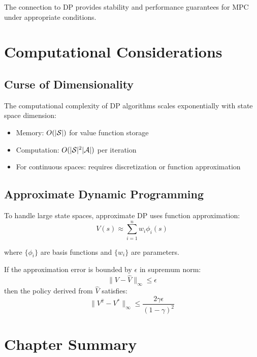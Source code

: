The connection to DP provides stability and performance guarantees for MPC under appropriate conditions.

\section{Computational Considerations}

\subsection{Curse of Dimensionality}

The computational complexity of DP algorithms scales exponentially with state space dimension:
\begin{itemize}
    \item Memory: $O(|\mathcal{S}|)$ for value function storage
    \item Computation: $O(|\mathcal{S}|^2 |\mathcal{A}|)$ per iteration
    \item For continuous spaces: requires discretization or function approximation
\end{itemize}

\subsection{Approximate Dynamic Programming}

To handle large state spaces, approximate DP uses function approximation:
\begin{equation}
V(s) \approx \sum_{i=1}^n w_i \phi_i(s)
\end{equation}

where $\{\phi_i\}$ are basis functions and $\{w_i\}$ are parameters.

\begin{theorem}
If the approximation error is bounded by $\epsilon$ in supremum norm:
\begin{equation}
\|V - \hat{V}\|_\infty \leq \epsilon
\end{equation}
then the policy derived from $\hat{V}$ satisfies:
\begin{equation}
\|V^{\hat{\pi}} - V^*\|_\infty \leq \frac{2\gamma \epsilon}{(1-\gamma)^2}
\end{equation}
\end{theorem}

\section{Chapter Summary}

